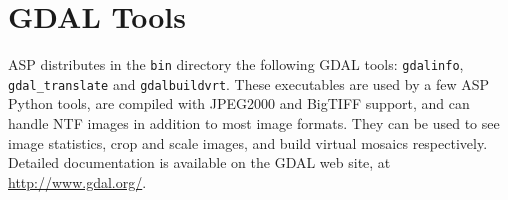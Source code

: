 \section{GDAL Tools}

ASP distributes in the \texttt{bin} directory the following GDAL tools:
\texttt{gdalinfo}, \texttt{gdal\_translate} and \texttt{gdalbuildvrt}.
These executables are used by a few ASP Python tools, are compiled with
JPEG2000 and BigTIFF support, and can handle NTF images in addition to
most image formats.  They can be used to see image statistics, crop and
scale images, and build virtual mosaics respectively. Detailed
documentation is available on the GDAL web site, at
\url{http://www.gdal.org/}.
